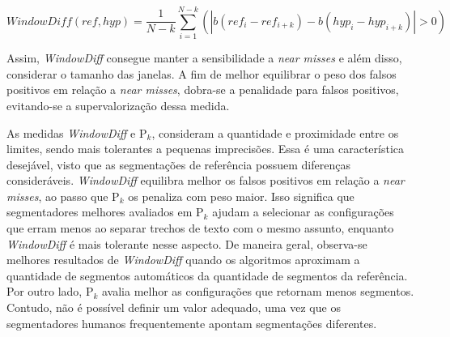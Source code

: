 \begin{equation}
	WindowDiff(ref,hyp) = \frac{1}{N-k}\sum_{i=1}^{N-k}(|b(ref_i - ref_{i+k}) - b(hyp_i - hyp_{i+k})| > 0)
	\label{equ:windiff}
\end{equation}


Assim, \textit{WindowDiff} consegue manter a sensibilidade a \textit{near misses} e além disso, considerar o tamanho das janelas.  A fim de melhor equilibrar o peso dos falsos positivos em relação a \textit{near misses}, dobra-se a penalidade para falsos positivos, evitando-se a supervalorização dessa medida.  %

As medidas \textit{WindowDiff} e P$_k$, consideram a quantidade e proximidade entre os limites, sendo mais tolerantes a pequenas imprecisões. Essa é uma característica desejável, visto que as segmentações de referência possuem diferenças consideráveis. \textit{WindowDiff} equilibra melhor os falsos positivos em relação a \textit{near misses}, ao passo que P$_k$ os penaliza com peso maior. Isso significa que segmentadores melhores avaliados em P$_k$ ajudam a selecionar as configurações que erram menos ao separar trechos de texto com o mesmo assunto, enquanto \textit{WindowDiff} é mais tolerante nesse aspecto.  De maneira geral, observa-se  melhores resultados de \textit{WindowDiff} quando os algoritmos aproximam a quantidade de segmentos automáticos da quantidade de segmentos da referência. Por outro lado, P$_k$ avalia melhor as configurações que retornam menos segmentos. Contudo, não é possível definir um valor adequado, uma vez que os segmentadores humanos frequentemente apontam segmentações diferentes.


